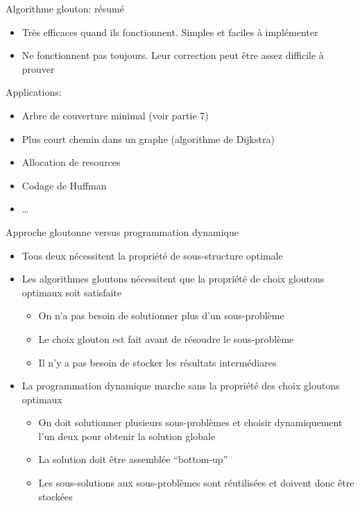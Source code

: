 \begin{frame}{Algorithme glouton: résumé}

\begin{itemize}
\item Très efficaces quand ils fonctionnent. Simples et faciles à
  implémenter
\item Ne fonctionnent pas toujours. Leur correction peut être assez
  difficile à prouver
\end{itemize}

\bigskip

Applications:
\begin{itemize}
\item Arbre de couverture minimal (voir partie 7)
\item Plus court chemin dans un graphe (algorithme de Dijkstra)
\item Allocation de resources
\item Codage de Huffman
\item \ldots
\end{itemize}

\end{frame}

\begin{frame}{Approche gloutonne versus programmation dynamique}

\begin{itemize}
\item Tous deux nécessitent la propriété de sous-structure optimale

\bigskip

\item Les algorithmes gloutons nécessitent que la propriété de choix gloutons optimaux soit satisfaite
\begin{itemize}
\item On n'a pas besoin de solutionner plus d'un sous-problème
\item Le choix glouton est fait \alert{avant} de résoudre le sous-problème
\item Il n'y a pas besoin de stocker les résultats intermédiares
\end{itemize}

\bigskip

\item La programmation dynamique marche sans la propriété des choix gloutons optimaux
\begin{itemize}
\item On doit solutionner plusieurs sous-problèmes et choisir dynamiquement l'un deux pour obtenir la solution globale
\item La solution doit être assemblée ``bottom-up''
\item Les sous-solutions aux sous-problèmes sont réutilisées et doivent donc être stockées
\end{itemize}
\end{itemize}

\end{frame}

